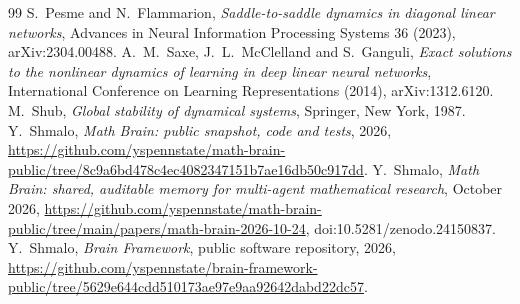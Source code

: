 \documentclass[11pt]{amsart}
\theoremstyle{definition}
\theoremstyle{remark}
\numberwithin{equation}{section}
\begin{document}
\begin{thebibliography}{99}
 S.~Pesme and N.~Flammarion, \emph{Saddle-to-saddle dynamics in diagonal linear networks}, Advances in Neural Information Processing Systems 36 (2023), arXiv:2304.00488.
 A.~M.~Saxe, J.~L.~McClelland and S.~Ganguli, \emph{Exact solutions to the nonlinear dynamics of learning in deep linear neural networks}, International Conference on Learning Representations (2014), arXiv:1312.6120.
 M.~Shub, \emph{Global stability of dynamical systems}, Springer, New York, 1987.
 Y.~Shmalo, \emph{Math Brain: public snapshot, code and tests}, 2026, \url{https://github.com/yspennstate/math-brain-public/tree/8c9a6bd478c4ec4082347151b7ae16db50c917dd}.
 Y.~Shmalo, \emph{Math Brain: shared, auditable memory for multi-agent mathematical research}, October 2026, \url{https://github.com/yspennstate/math-brain-public/tree/main/papers/math-brain-2026-10-24}, doi:10.5281/zenodo.24150837.
 Y.~Shmalo, \emph{Brain Framework}, public software repository, 2026, \url{https://github.com/yspennstate/brain-framework-public/tree/5629e644cdd510173ae97e9aa92642dabd22dc57}.
\end{thebibliography}
\end{document}
